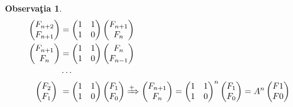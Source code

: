 \documentclass[12pt]{article}
\theoremstyle{definition}
\newtheorem{obs}{Observa\c tia}
\begin{document}
	\begin{obs} 
	\[\begin{aligned}
	\begin{pmatrix}
	F_{n+2}\\
	F_{n+1}
	\end{pmatrix} &= \begin{pmatrix}
	1&1\\
	1&0
	\end{pmatrix} \begin{pmatrix}
	F_{n+1}\\ F_n
\end{pmatrix}\\	
	\begin{pmatrix}
	F_{n+1}\\
	F_{n}
	\end{pmatrix} &= \begin{pmatrix}
	1&1\\
	1&0
	\end{pmatrix} \begin{pmatrix}
	F_{n}\\ F_{n-1}
	\end{pmatrix}\\
	 &\cdots \\
	\begin{pmatrix}
	F_{2}\\
	F_{1}
	\end{pmatrix}\  &= \begin{pmatrix}
	1&1\\
	1&0
	\end{pmatrix} \begin{pmatrix}
	F_{1}\\ F_0
	\end{pmatrix} \xRightarrow{+} \begin{pmatrix}
	F_{n+1}\\
	F_{n}
	\end{pmatrix} = \begin{pmatrix}
	1&1\\
	1&0
	\end{pmatrix}^n \begin{pmatrix}
	F_1\\ F_0 
	\end{pmatrix}=A^n \begin{pmatrix}
	F1 \\ F0
	\end{pmatrix}
	\end{aligned}\]
	\end{obs}
\end{document}
